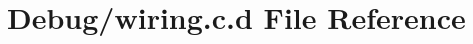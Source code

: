 \hypertarget{_debug_2wiring_8c_8d}{\section{\-Debug/wiring.c.\-d \-File \-Reference}
\label{_debug_2wiring_8c_8d}
}
